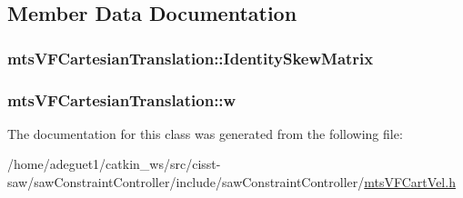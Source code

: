 \subsection{Member Data Documentation}
\hypertarget{classmts_v_f_cartesian_translation_ac1142bba466b1bf454c1c5f9aed054f5}{
\subsubsection[{Identity\-Skew\-Matrix}]{ mts\-V\-F\-Cartesian\-Translation\-::\-Identity\-Skew\-Matrix}}\label{classmts_v_f_cartesian_translation_ac1142bba466b1bf454c1c5f9aed054f5}
\hypertarget{classmts_v_f_cartesian_translation_acce719308f90543b9c42b923ad079df4}{
\subsubsection[{w}]{ mts\-V\-F\-Cartesian\-Translation\-::w}}\label{classmts_v_f_cartesian_translation_acce719308f90543b9c42b923ad079df4}


The documentation for this class was generated from the following file\-:\begin{DoxyCompactItemize}
\item 
/home/adeguet1/catkin\-\_\-ws/src/cisst-\/saw/saw\-Constraint\-Controller/include/saw\-Constraint\-Controller/\hyperlink{mts_v_f_cart_vel_8h}{mts\-V\-F\-Cart\-Vel.\-h}\end{DoxyCompactItemize}
